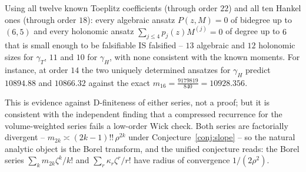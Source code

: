 Using all twelve known Toeplitz coefficients (through order $22$) and all
ten Hankel ones (through order $18$): every algebraic ansatz
$P(z,M)=0$ of bidegree up to $(6,5)$ and every holonomic ansatz
$\sum_{j\le4}p_j(z)M^{(j)}=0$ of degree up to $6$ that is small enough to
be falsifiable IS falsified -- $13$ algebraic and $12$ holonomic sizes for
$\gamma_T$, $11$ and $10$ for $\gamma_H$, with none consistent with the
known moments.  For instance, at order $14$ the two uniquely determined
ansatzes for $\gamma_H$ predict $10894.88$ and $10866.32$ against the
exact $m_{16}=\tfrac{9179819}{840}=10928.356$.

This is evidence against D-finiteness of either series, not a proof; but
it is consistent with the independent finding that a compressed
recurrence for the volume-weighted series fails a low-order Wick check.
Both series are factorially divergent -- $m_{2k}\asymp(2k-1)!!\,\rho^{2k}$
under Conjecture~\ref{conj:slope} -- so the natural analytic object is
the Borel transform, and the unified conjecture reads: the Borel series
$\sum_k m_{2k}\zeta^k/k!$ and $\sum_r\kappa_r\zeta^r/r!$ have radius of
convergence $1/(2\rho^2)$.
